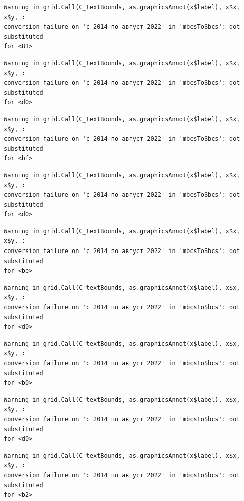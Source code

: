 \documentclass[
  letterpaper,
  DIV=11,
  numbers=noendperiod]{scrartcl}
\begin{document}
\begin{verbatim}
Warning in grid.Call(C_textBounds, as.graphicsAnnot(x$label), x$x, x$y, :
conversion failure on 'с 2014 по август 2022' in 'mbcsToSbcs': dot substituted
for <81>
\end{verbatim}

\begin{verbatim}
Warning in grid.Call(C_textBounds, as.graphicsAnnot(x$label), x$x, x$y, :
conversion failure on 'с 2014 по август 2022' in 'mbcsToSbcs': dot substituted
for <d0>
\end{verbatim}

\begin{verbatim}
Warning in grid.Call(C_textBounds, as.graphicsAnnot(x$label), x$x, x$y, :
conversion failure on 'с 2014 по август 2022' in 'mbcsToSbcs': dot substituted
for <bf>
\end{verbatim}

\begin{verbatim}
Warning in grid.Call(C_textBounds, as.graphicsAnnot(x$label), x$x, x$y, :
conversion failure on 'с 2014 по август 2022' in 'mbcsToSbcs': dot substituted
for <d0>
\end{verbatim}

\begin{verbatim}
Warning in grid.Call(C_textBounds, as.graphicsAnnot(x$label), x$x, x$y, :
conversion failure on 'с 2014 по август 2022' in 'mbcsToSbcs': dot substituted
for <be>
\end{verbatim}

\begin{verbatim}
Warning in grid.Call(C_textBounds, as.graphicsAnnot(x$label), x$x, x$y, :
conversion failure on 'с 2014 по август 2022' in 'mbcsToSbcs': dot substituted
for <d0>
\end{verbatim}

\begin{verbatim}
Warning in grid.Call(C_textBounds, as.graphicsAnnot(x$label), x$x, x$y, :
conversion failure on 'с 2014 по август 2022' in 'mbcsToSbcs': dot substituted
for <b0>
\end{verbatim}

\begin{verbatim}
Warning in grid.Call(C_textBounds, as.graphicsAnnot(x$label), x$x, x$y, :
conversion failure on 'с 2014 по август 2022' in 'mbcsToSbcs': dot substituted
for <d0>
\end{verbatim}

\begin{verbatim}
Warning in grid.Call(C_textBounds, as.graphicsAnnot(x$label), x$x, x$y, :
conversion failure on 'с 2014 по август 2022' in 'mbcsToSbcs': dot substituted
for <b2>
\end{verbatim}
\end{document}
